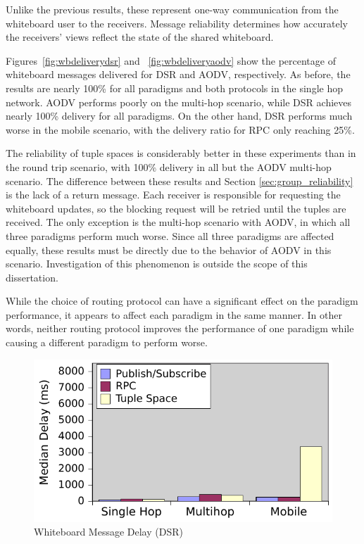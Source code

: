 Unlike the previous results, these represent one-way communication from the whiteboard user to the receivers. Message reliability determines how accurately the receivers' views reflect the state of the shared whiteboard.

Figures~\ref{fig:wbdeliverydsr} and ~\ref{fig:wbdeliveryaodv} show the percentage of whiteboard messages delivered for DSR and AODV, respectively. As before, the results are nearly 100\% for all paradigms and both protocols in the single hop network. AODV performs poorly on the multi-hop scenario, while DSR achieves nearly 100\% delivery for all paradigms. On the other hand, DSR performs much worse in the mobile scenario, with the delivery ratio for RPC only reaching 25\%.

The reliability of tuple spaces is considerably better in these experiments than in the round trip scenario, with 100\% delivery in all but the AODV multi-hop scenario. The difference between these results and Section \ref{sec:group_reliability} is the lack of a return message. Each receiver is responsible for requesting the whiteboard updates, so the blocking request will be retried until the tuples are received. The only exception is the multi-hop scenario with AODV, in which all three paradigms perform much worse. Since all three paradigms are affected equally, these results must be directly due to the behavior of AODV in this scenario. Investigation of this phenomenon is outside the scope of this dissertation.

While the choice of routing protocol can have a significant effect on the paradigm performance, it appears to affect each paradigm in the same manner. In other words, neither routing protocol improves the performance of one paradigm while causing a different paradigm to perform worse.

\begin{figure}
\centering
\includegraphics[scale = 1, clip, trim = 6px 0px 4px 3px]{figures/wb-dsr-delay.pdf}
\caption{Whiteboard Message Delay (DSR)}
\label{fig:wbdelaydsr}
\end{figure}

